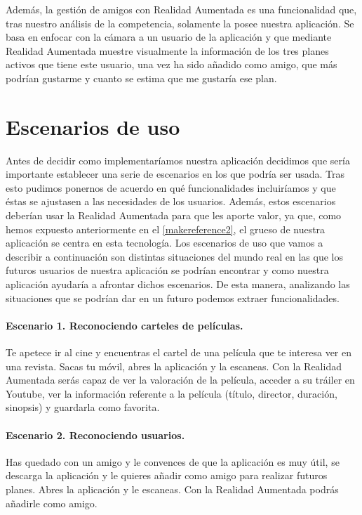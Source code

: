 Además, la gestión de amigos con Realidad Aumentada es una funcionalidad que, tras nuestro análisis de la competencia, solamente la posee nuestra aplicación. 
Se basa en enfocar con la cámara a un usuario de la aplicación y que mediante Realidad Aumentada muestre visualmente la información de los tres 
 planes activos que tiene este usuario, una vez ha sido añadido como amigo, que más podrían gustarme y cuanto se estima que me gustaría ese plan.
    
\section{Escenarios de uso}
\label{makereference3.2}
Antes de decidir como implementaríamos nuestra aplicación decidimos que sería importante establecer una serie
de escenarios en los que podría ser usada. Tras esto pudimos ponernos de acuerdo en qué funcionalidades incluiríamos y que 
éstas se ajustasen a las necesidades de los usuarios. Además, estos escenarios deberían usar la Realidad Aumentada para que 
les aporte valor, ya que, como hemos expuesto anteriormente en el \autoref{makereference2}, el grueso de nuestra aplicación se centra en esta tecnología.
Los escenarios de uso que vamos a describir a continuación son distintas situaciones del mundo real en las que los futuros usuarios de nuestra aplicación se podrían encontrar y como nuestra aplicación ayudaría a afrontar dichos escenarios. 
De esta manera, analizando las situaciones que se podrían dar en un futuro podemos extraer funcionalidades.

\paragraph{Escenario 1. Reconociendo carteles de películas.}
    Te apetece ir al cine y encuentras el cartel de una película que te interesa ver en una revista. Sacas tu móvil, abres la aplicación y 
    la escaneas. Con la Realidad Aumentada serás capaz de ver la valoración de la película, acceder a su tráiler en Youtube, ver la información
    referente a la película (título, director, duración, sinopsis) y guardarla como favorita.
    
\paragraph{Escenario 2. Reconociendo usuarios.}
    Has quedado con un amigo y le convences de que la aplicación es muy útil, se descarga la aplicación y le quieres añadir como amigo para realizar futuros planes. Abres la aplicación y le escaneas. Con la Realidad Aumentada podrás añadirle como amigo.

